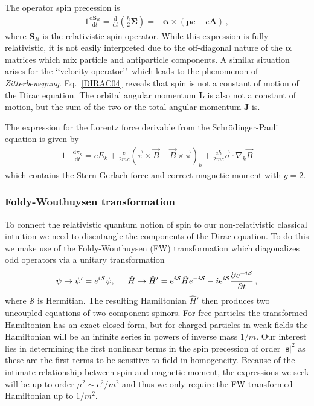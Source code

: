 The operator spin precession is
\begin{alignat}{1}
  \label{DIRAC04} \frac{\mathrm{d}\mathbf{S}_{R}}{\mathrm{d}t}=\frac{\mathrm{d}}{\mathrm{d}t}\left(\frac{\hbar}{2}\boldsymbol{\Sigma}\right)=-\boldsymbol{\alpha}\times\left(\mathbf{p}c-e\mathbf{A}\right)\,,
\end{alignat}
where $\mathbf{S}_{R}$ is the relativistic spin operator. While this expression is fully relativistic, it is not easily interpreted due to the off-diagonal nature of the $\boldsymbol{\alpha}$ matrices which mix particle and antiparticle components. A similar situation arises for the \lq\lq velocity operator\rq\rq\, which leads to the phenomenon of \emph{Zitterbewegung}. Eq.~\eqref{DIRAC04} reveals that spin is not a constant of motion of the Dirac equation. The orbital angular momentum $\mathbf{L}$ is also not a constant of motion, but the sum of the two or the total angular momentum $\mathbf{J}$ is.

The expression for the Lorentz force derivable from the Schr{\"o}dinger-Pauli equation is given by
\begin{alignat}{1}
  \label{m31}		&\frac{\mathrm{d}\pi_{k}}{\mathrm{d}t}=eE_{k}+\frac{e}{2mc}(\vec{\pi}\times\vec{B}-\vec{B}\times\vec{\pi})_{k}+\frac{e\hbar}{2mc}\vec{\sigma}\cdot\nabla_{k}\vec{B}
\end{alignat}
which contains the Stern-Gerlach force and correct magnetic moment with $g=2$.

\subsubsection{Foldy-Wouthuysen transformation}
To connect the relativistic quantum notion of spin to our non-relativistic classical intuition we need to disentangle the components of the Dirac equation. To do this we make use of the Foldy-Wouthuysen (FW) transformation which diagonalizes odd operators via a unitary transformation
\begin{alignat}{1}
  \label{FW01} \psi\rightarrow\psi'=e^{i\mathcal{S}}\psi,\indent\hat{H}\rightarrow\hat{H}'=e^{i\mathcal{S}}\hat{H}e^{-i\mathcal{S}}-ie^{i\mathcal{S}}\frac{\partial e^{-i\mathcal{S}}}{\partial t}\,,
\end{alignat}
where $\mathcal{S}$ is Hermitian. The resulting Hamiltonian $\hat{H}'$ then produces two uncoupled equations of two-component spinors. For free particles the transformed Hamiltonian has an exact closed form, but for charged particles in weak fields the Hamiltonian will be an infinite series in powers of inverse mass $1/m$. Our interest lies in determining the first nonlinear terms in the spin precession of order $|\mathbf{s}|^{2}$ as these are the first terms to be sensitive to field in-homogeneity. Because of the intimate relationship between spin and magnetic moment, the expressions we seek will be up to order $\mu^{2}\sim e^{2}/m^{2}$ and thus we only require the FW transformed Hamiltonian up to $1/m^{2}$.

